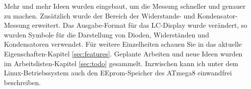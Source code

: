 Mehr und mehr Ideen wurden eingebaut, um die Messung schneller und genauer zu machen.
Zus\"atzlich wurde der Bereich der Widerstands- und Kondensator-Messung erweitert.
Das Ausgabe-Format f\"ur das LC-Display wurde ver\"andert, so wurden Symbole f\"ur die Darstellung von
Dioden, Widerst\"anden und Kondensatoren verwendet.
F\"ur weitere Einzelheiten schauen Sie in das aktuelle Eigenschaften-Kapitel \ref{sec:features}.
Geplante Arbeiten und neue Ideen wurden im Arbeitslisten-Kapitel \ref{sec:todo} gesammelt.
Inzwischen kann ich unter dem Linux-Betriebssystem auch den EEprom-Speicher des ATmega8 einwandfrei beschreiben.

